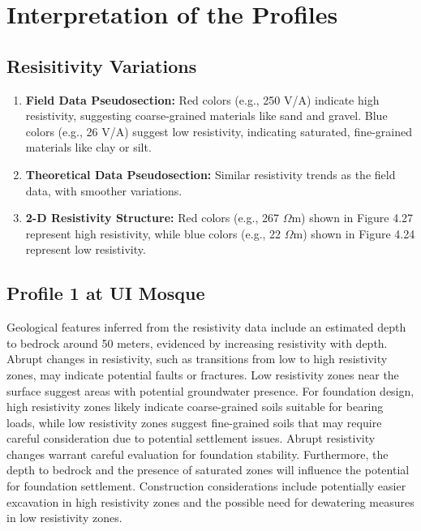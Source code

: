 \documentclass[12pt,a4paper]{report}
\begin{document}
\section{Interpretation of the Profiles}

\subsection{Resisitivity Variations}

\begin{enumerate}
    \item \textbf{Field Data Pseudosection:} Red colors (e.g., 250 V/A) indicate high resistivity, suggesting coarse-grained materials like sand and gravel. Blue colors (e.g., 26 V/A) suggest low resistivity, indicating saturated, fine-grained materials like clay or silt.

    \item \textbf{Theoretical Data Pseudosection:} Similar resistivity trends as the field data, with smoother variations.

    \item \textbf{2-D Resistivity Structure:} Red colors (e.g., 267 $\Omega$m) shown in Figure 4.27 represent high resistivity, while blue colors (e.g., 22 $\Omega$m) shown in Figure 4.24 represent low resistivity.

\end{enumerate}

\subsection{Profile 1 at UI Mosque}
Geological features inferred from the resistivity data include an estimated depth to bedrock around 50 meters, evidenced by increasing resistivity with depth. Abrupt changes in resistivity, such as transitions from low to high resistivity zones, may indicate potential faults or fractures. Low resistivity zones near the surface suggest areas with potential groundwater presence. For foundation design, high resistivity zones likely indicate coarse-grained soils suitable for bearing loads, while low resistivity zones suggest fine-grained soils that may require careful consideration due to potential settlement issues. Abrupt resistivity changes warrant careful evaluation for foundation stability. Furthermore, the depth to bedrock and the presence of saturated zones will influence the potential for foundation settlement. Construction considerations include potentially easier excavation in high resistivity zones and the possible need for dewatering measures in low resistivity zones.
\end{document}
